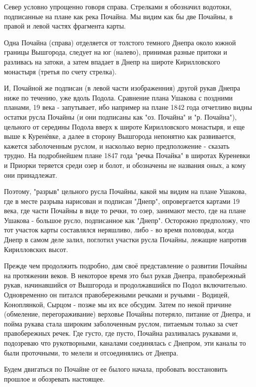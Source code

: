 Север условно упрощенно говоря справа. Стрелками я обозначил водотоки, подписанные на плане как река Почайна. Мы видим как бы две Почайны, в правой и левой частях фрагмента карты.

Одна Почайна (справа) отделяется от толстого темного Днепра около южной границы Вышгорода, следует на юг (налево), принимая разные притоки и разливась на затоки, а затем впадает в Днепр на широте Кирилловского монастыря (третья по счету стрелка). 

И, Почайной же подписан (в левой части изображенния) другой рукав Днепра ниже по течению, уже вдоль Подола. Сравнение плана Ушакова с поздними планами, 19 века - запутывает, ибо например на плане 1842 года отчетливо видны остатки русла Почайны (и они подписаны как "оз. Почайна" и "р. Почайна"), цельного от середины Подола вверх к широте Кирилловского монастыря, и еще выше к Куренёвке, а далее в сторону Вышгорода непонятно как развивается, кажется заболоченным руслом, и насколько верно предположение - сказать трудно. На подробнейшем плане 1847 года "речка Почайка" в широтах Куреневки и Приорки теряется среди озер и болот, и обозначены не названия оных, а кому они принадлежат.

Поэтому, "разрыв" цельного русла Почайны, какой мы видим на плане Ушакова, где в месте разрыва нарисован и подписан "Днепр", опровергается картами 19 века, где части Почайны в виде то речки, то озер, занимают место, где на плане Ушакова - большое русло, подписанное как "Днепр". Осторожно предположу, что тот участок карты составлялся неряшливо, либо - во время половодья, когда Днепр в самом деле залил, поглотил участки русла Почайны, лежащие напротив Кирилловских высот.

Прежде чем продолжить подробно, дам своё представление о развитии Почайны на протяжении веков. В некоторое время это был рукав Днепра, правобережный рукав, начинавшийся от Вышгорода и продолжавшийся по Подол включительно. Одновременно он питался правобережными речками и ручьями - Водицей, Коноплянкой, Сырцом - позже мы их все обсудим. Затем по некой причине (обмеление, перегораживание) верховье Почайны потеряло, питание от Днепра, и пойма рукава стала широким заболоченным руслом, питаемым только за счет правобережных речек. Где густо, где пусто, Почайна разливалась рукавами и, подозреваю что рукотворными, каналами соединялась с Днепром, эти каналы то были проточными, то мелели и отсоединялись от Днепра.

Будем двигаться по Почайне от ее былого начала, пробовать восстановить прошлое и обозревать настоящее.


